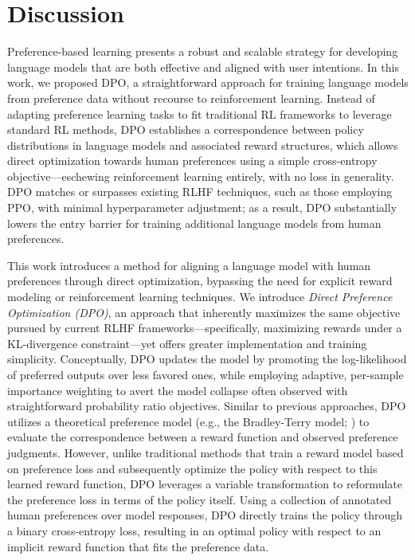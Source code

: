 \section{Discussion}
Preference-based learning presents a robust and scalable strategy for developing language models that are both effective and aligned with user intentions. In this work, we proposed DPO, a straightforward approach for training language models from preference data without recourse to reinforcement learning. Instead of adapting preference learning tasks to fit traditional RL frameworks to leverage standard RL methods, DPO establishes a correspondence between policy distributions in language models and associated reward structures, which allows direct optimization towards human preferences using a simple cross-entropy objective—eschewing reinforcement learning entirely, with no loss in generality. DPO matches or surpasses existing RLHF techniques, such as those employing PPO, with minimal hyperparameter adjustment; as a result, DPO substantially lowers the entry barrier for training additional language models from human preferences.

This work introduces a method for aligning a language model with human preferences through direct optimization, bypassing the need for explicit reward modeling or reinforcement learning techniques. We introduce \textit{{Direct Preference Optimization} (DPO)}, an approach that inherently maximizes the same objective pursued by current RLHF frameworks—specifically, maximizing rewards under a KL-divergence constraint—yet offers greater implementation and training simplicity. Conceptually, DPO updates the model by promoting the log-likelihood of preferred outputs over less favored ones, while employing adaptive, per-sample importance weighting to avert the model collapse often observed with straightforward probability ratio objectives. Similar to previous approaches, DPO utilizes a theoretical preference model (e.g., the Bradley-Terry model; \cite{bradley1952rankanalysis}) to evaluate the correspondence between a reward function and observed preference judgments. However, unlike traditional methods that train a reward model based on preference loss and subsequently optimize the policy with respect to this learned reward function, DPO leverages a variable transformation to reformulate the preference loss in terms of the policy itself. Using a collection of annotated human preferences over model responses, DPO directly trains the policy through a binary cross-entropy loss, resulting in an optimal policy with respect to an implicit reward function that fits the preference data.


